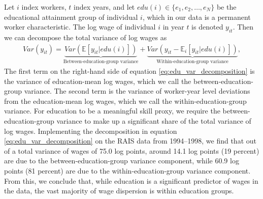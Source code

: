 Let $i$ index workers, $t$ index years, and let $edu(i) \in \{ e_{1}, e_{2}, \ldots, e_{N} \}$ be the educational attainment group of individual $i$, which in our data is a permanent worker characteristic. The log wage of individual $i$ in year $t$ is denoted $y_{it}$. Then we can decompose the total variance of log wages as
%
\begin{align}
  Var(y_{it}) = \underbrace{Var(\mathbb{E}[y_{it} | edu(i)])}_{\text{Between-education-group variance}} + \underbrace{Var(y_{it} - \mathbb{E}_{i}[y_{it} | edu(i)])}_{\text{Within-education-group variance}},\label{eq:edu_var_decomposition}
\end{align}
%
The first term on the right-hand side of equation \eqref{eq:edu_var_decomposition} is the variance of education-mean log wages, which we call the between-education-group variance. The second term is the variance of worker-year level deviations from the education-mean log wages, which we call the within-education-group variance. For education to be a meaningful skill proxy, we require the between-education-group variance to make up a significant share of the total variance of log wages. Implementing the decomposition in equation \eqref{eq:edu_var_decomposition} on the RAIS data from 1994--1998, we find that out of a total variance of wages of 75.0 log points, around 14.1 log points (19 percent) are due to the between-education-group variance component, while 60.9 log points (81 percent) are due to the within-education-group variance component. From this, we conclude that, while education is a significant predictor of wages in the data, the vast majority of wage dispersion is within education groups.

